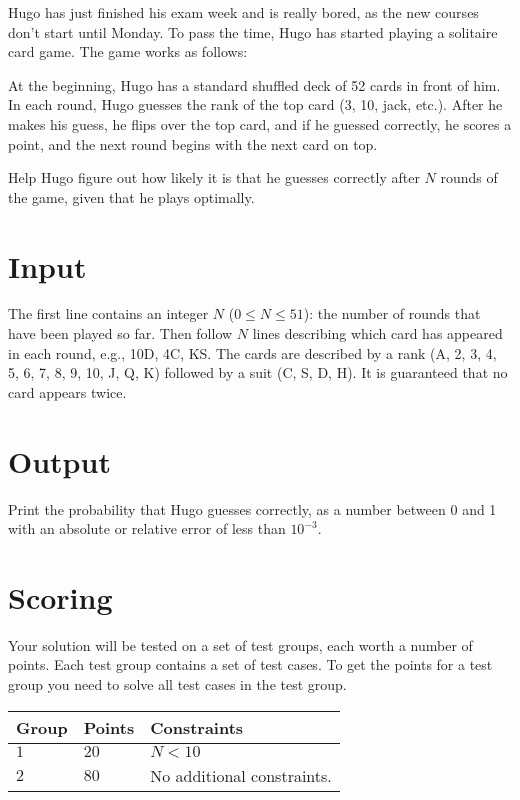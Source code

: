 Hugo has just finished his exam week and is really bored, as the new courses don't start until Monday.
To pass the time, Hugo has started playing a solitaire card game. The game works as follows:

At the beginning, Hugo has a standard shuffled deck of 52 cards in front of him. In each round, Hugo guesses the rank of the top card (3, 10, jack, etc.).
After he makes his guess, he flips over the top card, and if he guessed correctly, he scores a point, and the next round begins with the next card on top.

Help Hugo figure out how likely it is that he guesses correctly after $N$ rounds of the game, given that he plays optimally.

\section*{Input}
The first line contains an integer $N$ ($0 \le N \le 51$): the number of rounds that have been played so far.
Then follow $N$ lines describing which card has appeared in each round, e.g., 10D, 4C, KS.
The cards are described by a rank (A, 2, 3, 4, 5, 6, 7, 8, 9, 10, J, Q, K) followed by a suit (C, S, D, H).
It is guaranteed that no card appears twice.

\section*{Output}
Print the probability that Hugo guesses correctly, as a number between 0 and 1 with an absolute or relative error of less than $10^{-3}$.

\section*{Scoring}
Your solution will be tested on a set of test groups, each worth a number of points. Each test group contains
a set of test cases. To get the points for a test group you need to solve all test cases in the test group.

\noindent
\begin{tabular}{| l | l | p{12cm} |}
  \hline
  \textbf{Group} & \textbf{Points} & \textbf{Constraints} \\ \hline
  $1$    & $20$       & $N < 10$ \\ \hline
  $2$    & $80$       & No additional constraints. \\ \hline
\end{tabular}
